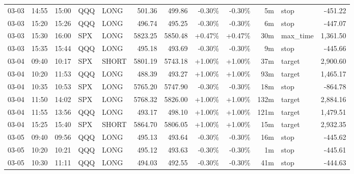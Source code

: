 \documentclass[11pt,a4paper]{article}
\begin{document}
\begin{center}
\begin{longtable}{>{\color{txtmain}}l l l l l r r r r r >{\color{txtmain}}l r}
03-03 & 14:55 & 15:00 & QQQ & LONG & 501.36 & 499.86 & \textcolor{lossred}{-0.30\%} & \textcolor{lossred}{-0.30\%} & 5m & stop & \textcolor{lossred}{-451.22} \\
03-03 & 15:20 & 15:26 & QQQ & LONG & 496.74 & 495.25 & \textcolor{lossred}{-0.30\%} & \textcolor{lossred}{-0.30\%} & 6m & stop & \textcolor{lossred}{-447.07} \\
03-03 & 15:30 & 16:00 & SPX & LONG & 5823.25 & 5850.48 & \textcolor{wingreen}{+0.47\%} & \textcolor{wingreen}{+0.47\%} & 30m & max\_time & \textcolor{wingreen}{1,361.50} \\
03-03 & 15:35 & 15:44 & QQQ & LONG & 495.18 & 493.69 & \textcolor{lossred}{-0.30\%} & \textcolor{lossred}{-0.30\%} & 9m & stop & \textcolor{lossred}{-445.66} \\
03-04 & 09:40 & 10:17 & SPX & SHORT & 5801.19 & 5743.18 & \textcolor{wingreen}{+1.00\%} & \textcolor{wingreen}{+1.00\%} & 37m & target & \textcolor{wingreen}{2,900.60} \\
03-04 & 10:20 & 11:53 & QQQ & LONG & 488.39 & 493.27 & \textcolor{wingreen}{+1.00\%} & \textcolor{wingreen}{+1.00\%} & 93m & target & \textcolor{wingreen}{1,465.17} \\
03-04 & 10:35 & 10:53 & SPX & LONG & 5765.20 & 5747.90 & \textcolor{lossred}{-0.30\%} & \textcolor{lossred}{-0.30\%} & 18m & stop & \textcolor{lossred}{-864.78} \\
03-04 & 11:50 & 14:02 & SPX & LONG & 5768.32 & 5826.00 & \textcolor{wingreen}{+1.00\%} & \textcolor{wingreen}{+1.00\%} & 132m & target & \textcolor{wingreen}{2,884.16} \\
03-04 & 11:55 & 13:56 & QQQ & LONG & 493.17 & 498.10 & \textcolor{wingreen}{+1.00\%} & \textcolor{wingreen}{+1.00\%} & 121m & target & \textcolor{wingreen}{1,479.51} \\
03-04 & 15:25 & 15:40 & SPX & SHORT & 5864.70 & 5806.05 & \textcolor{wingreen}{+1.00\%} & \textcolor{wingreen}{+1.00\%} & 15m & target & \textcolor{wingreen}{2,932.35} \\
03-05 & 09:40 & 09:56 & QQQ & LONG & 495.13 & 493.64 & \textcolor{lossred}{-0.30\%} & \textcolor{lossred}{-0.30\%} & 16m & stop & \textcolor{lossred}{-445.62} \\
03-05 & 10:20 & 10:21 & QQQ & LONG & 495.12 & 493.63 & \textcolor{lossred}{-0.30\%} & \textcolor{lossred}{-0.30\%} & 1m & stop & \textcolor{lossred}{-445.61} \\
03-05 & 10:30 & 11:11 & QQQ & LONG & 494.03 & 492.55 & \textcolor{lossred}{-0.30\%} & \textcolor{lossred}{-0.30\%} & 41m & stop & \textcolor{lossred}{-444.63} \\

\end{longtable}
\end{center}
\end{document}
